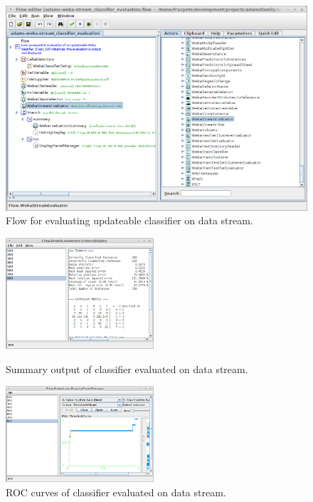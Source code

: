 \begin{figure}[ht]
  \begin{minipage}[t]{0.5\linewidth}
    \centering
    \includegraphics[width=12.0cm]{images/basic-streameval-flow.png}
    \caption{Flow for evaluating updateable classifier on data stream.}
    \label{basic-streameval-flow}
  \end{minipage}
\end{figure}

\begin{figure}[ht]
  \begin{minipage}[t]{0.5\linewidth}
    \centering
    \includegraphics[width=5.5cm]{images/basic-streameval-output.png}
    \caption{Summary output of classifier evaluated on data stream.}
    \label{basic-streameval-output}
  \end{minipage}
  \hspace{0.5cm}
  \begin{minipage}[t]{0.5\linewidth}
    \centering
    \includegraphics[width=5.5cm]{images/basic-streameval-output2.png}
    \caption{ROC curves of classifier evaluated on data stream.}
    \label{basic-streameval-output2}
  \end{minipage}
\end{figure}


